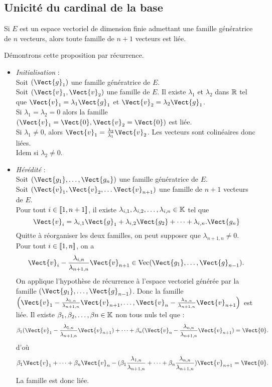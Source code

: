\documentclass{book}
\begin{document}
\subsection{Unicité du cardinal de la base}
\begin{Proposition}
Si $E$ est un espace vectoriel de dimension finie admettant une famille génératrice de $n$ vecteurs, alors toute famille de $n+1$ vecteurs est liée.
\end{Proposition}
\begin{Demonstration}
Démontrons cette proposition par récurrence.
\begin{itemize}
\item \textit{Initialisation} :\\
Soit $(\Vect{g}_1)$ une famille génératrice de $E$.\\
Soit $(\Vect{v}_1,\Vect{v}_2)$ une famille de $E$. Il existe $\lambda_1$ et $\lambda_2$ dans $\mathbb{R}$ tel que $\Vect{v}_1=\lambda_1 \Vect{g}_1$ et $\Vect{v}_2=\lambda_2 \Vect{g}_1$.\\
Si  $\lambda_1=\lambda_2=0$ alors la famille $(\Vect{v}_1=\Vect{0},\Vect{v}_2=\Vect{0})$ est liée.\\
Si $\lambda_1\neq 0$, alors $\Vect{v}_1=\frac{\lambda_2}{\lambda_1}\Vect{v}_2$. Les vecteurs sont colinéaires donc liées.\\
Idem si $\lambda_2\neq 0$.\\
\item \textit{Hérédité} :\\
Soit $(\Vect{g_1},\dots,\Vect{g_n})$ une famille génératrice de $E$.\\
Soit $(\Vect{v}_1, \Vect{v}_2,\dots \Vect{v}_{n+1})$ une famille de $n+1$ vecteurs de $E$.\\
Pour tout $i\in \mathopen\lbrack\!\lbrack1,n+1 \mathclose\rbrack\!\rbrack$, il existe $\lambda_{i,1},\lambda_{i,2},\dots,\lambda_{i,n}\in\mathbb{K}$ tel que $$\Vect{v}_i=  \lambda_{i,1}\Vect{g}_1 + \lambda_{i,2}\Vect{g_2}+\dots+\lambda_{i,n}.\Vect{g_n}$$
Quitte à réorganiser les deux familles, on peut supposer que $\lambda_{n+1,n}\neq 0$. \\
Pour tout  $i\in \mathopen\lbrack\!\lbrack1,n \mathclose\rbrack\!\rbrack$, on a 
$$\Vect{v}_i-\frac{\lambda_{i,n}}{\lambda_{n+1,n}}\Vect{v}_{n+1}\in \operatorname{Vec} (\Vect{g_1},\dots,\Vect{g}_{n-1}).$$
On applique l'hypothèse de récurrence à l'espace vectoriel générée par la famille $(\Vect{g_1},\dots,\Vect{g}_{n-1})$. Donc la famille $\left(\Vect{v}_1-\frac{\lambda_{1,n}}{\lambda_{n+1,n}}\Vect{v}_{n+1},\dots, \Vect{v}_n-\frac{\lambda_{n,n}}{\lambda_{n+1,n}}\Vect{v}_{n+1}\right)$ est liée. Il existe  $\beta_{1},\beta_{2},\dots,\beta{n}\in\mathbb{K}$ non tous nuls tel que :
$$\beta_1 (\Vect{v}_1-\frac{\lambda_{1,n}}{\lambda_{n+1,n}}\Vect{v}_{n+1})+\dots+\beta_n (\Vect{v}_n-\frac{\lambda_{n,n}}{\lambda_{n+1,n}}\Vect{v}_{n+1})=\Vect{0}.$$
d'où 
$$\beta_1\Vect{v}_1+\dots +\beta_n\Vect{v}_n - (\beta_1\frac{\lambda_{1,n}}{\lambda_{n+1,n}}+\dots +\beta_n\frac{\lambda_{n,n}}{\lambda_{n+1,n}})\Vect{v}_{n+1}=\Vect{0}.$$
La famille est donc liée. 
\end{itemize}
\end{Demonstration}
\end{document}
